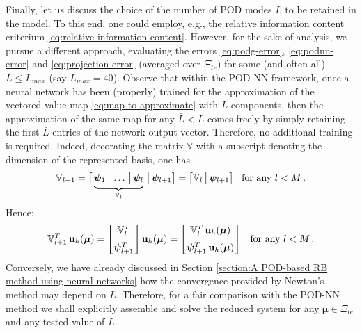 \documentclass[12pt, a4paper, twoside, openright, notitlepage]{report}
\numberwithin{equation}{chapter}
\theoremstyle{theorem}
\theoremstyle{definition}
\theoremstyle{remark}
\theoremstyle{proposition}
\numberwithin{figure}{chapter}
\newcommand{\bg}[1]{\boldsymbol{#1}}
\begin{document}
		Finally, let us discuss the choice of the number of POD modes $L$ to be retained in the model. To this end, one could employ, e.g., the relative information content criterium \eqref{eq:relative-information-content}. However, for the sake of analysis, we pursue a different approach, evaluating the errors \eqref{eq:podg-error}, \eqref{eq:podnn-error} and \eqref{eq:projection-error} (averaged over $\Xi_{te}$) for some (and often all) $L \leq L_{max}$ (say $L_{max} = 40$). Observe that within the POD-NN framework, once a neural network has been (properly) trained for the approximation of the vectored-value map \eqref{eq:map-to-approximate} with $L$ components, then the approximation of the same map for any $\bar{L} < L$ comes freely by simply retaining the first $\bar{L}$ entries of the network output vector. Therefore, no additional training is required. Indeed, decorating the matrix $\mathbb{V}$ with a subscript denoting the dimension of the represented basis, one has
		\begin{equation*}
			\mathbb{V}_{l+1} = \big[ \underbrace{\bg{\psi}_1 \, \big| \, \ldots \, \big| \, \bg{\psi}_l}_{\mathbb{V}_l} \, \big| \, \bg{\psi}_{l+1} \big] = \big[ \mathbb{V}_l \, \big| \, \bg{\psi}_{l+1} \big] \hspace*{0.3cm} \text{for any $l < M$} \, .
		\end{equation*}
		Hence:
		\begin{equation*}
			\mathbb{V}_{l+1}^T \, \mathbf{u}_h(\bg{\mu}) = 
			\begin{bmatrix}
				\hspace*{-0.15cm}
				\begin{array}{c}
					\mathbb{V}_{l}^T \\[0.2cm]
					\bg{\psi}_{l+1}^T 
				\end{array} 
				\hspace*{-0.15cm}
			\end{bmatrix}
			\mathbf{u}_h(\bg{\mu}) =
			\begin{bmatrix}
				\hspace*{-0.15cm}
				\begin{array}{c}
					\mathbb{V}_{l}^T \, \mathbf{u}_h(\bg{\mu}) \\[0.2cm]
					\bg{\psi}_{l+1}^T \, \mathbf{u}_h(\bg{\mu})
				\end{array} 
				\hspace*{-0.15cm}
			\end{bmatrix}
			\hspace*{0.3cm} \text{for any $l < M$} \, .
		\end{equation*}
		Conversely, we have already discussed in Section \ref{section:A POD-based RB method using neural networks} how the convergence provided by Newton's method may depend on $L$. Therefore, for a fair comparison with the POD-NN method we shall explicitly assemble and solve the reduced system for any $\bg{\mu} \in \Xi_{te}$ and any tested value of $L$.
			
\end{document}
